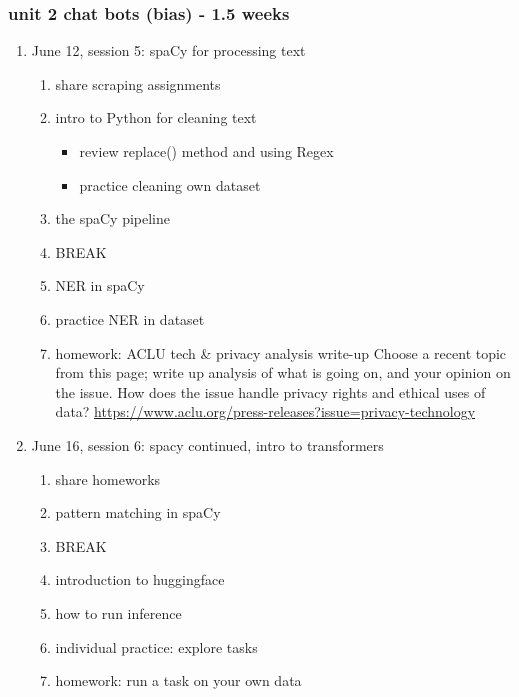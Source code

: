 \documentclass[11pt]{article}
\begin{document}
\subsubsection{unit 2 chat bots (bias) - 1.5 weeks}
\label{sec:orgde5316e}
\begin{enumerate}
\item June 12, session 5: spaCy for processing text
\label{sec:org31f9cab}
\begin{enumerate}
\item share scraping assignments
\label{sec:org483229d}
\item intro to Python for cleaning text
\label{sec:orgcac76c3}
\begin{itemize}
\item review replace() method and using Regex
\item practice cleaning own dataset
\end{itemize}
\item the spaCy pipeline
\label{sec:orgc878eb3}
\item BREAK
\label{sec:orgfb43b38}
\item NER in spaCy
\label{sec:org35e8a05}
\item practice NER in dataset
\label{sec:org8a82a6a}
\item homework: ACLU tech \& privacy analysis write-up
\label{sec:org842a53d}
Choose a recent topic from this page; write up analysis of what is
going on, and your opinion on the issue. How does the issue handle
privacy rights and ethical uses of data?
\url{https://www.aclu.org/press-releases?issue=privacy-technology}
\end{enumerate}

\item June 16, session 6: spacy continued, intro to transformers
\label{sec:orgaf65d6a}
\begin{enumerate}
\item share homeworks
\label{sec:org8117cf7}
\item pattern matching in spaCy
\label{sec:org203bc61}
\item BREAK
\label{sec:orgc653d0b}
\item introduction to huggingface
\label{sec:orgd0c53dc}
\item how to run inference
\label{sec:orga6cb1da}
\item individual practice: explore tasks
\label{sec:org0401b26}
\item homework: run a task on your own data
\label{sec:orgec48c48}
\end{enumerate}


\end{enumerate}
\end{document}
